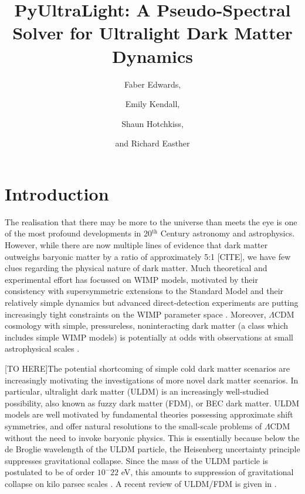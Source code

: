 \documentclass[a4paper,11pt]{article}
\title{ PyUltraLight: A Pseudo-Spectral Solver for Ultralight Dark Matter Dynamics}
\author[]{Faber Edwards,}
\author[]{Emily Kendall,}
\author[]{Shaun Hotchkiss,}
\author[]{and Richard Easther}
\affiliation[]{Department of Physics, University of Auckland, Private Bag 92019, Auckland, New Zealand}
\begin{document}
\maketitle
\flushbottom

\section{Introduction}
\label{sec:intro}

The realisation that there may be more to the universe than meets the eye is one of the most profound developments in 20$^{\textrm{th}}$ Century astronomy and astrophysics. However,  while there are now multiple lines of evidence that dark matter outweighs baryonic matter by a ratio of approximately 5:1 [CITE], we have few clues regarding the physical nature of dark matter.  Much theoretical and experimental effort has focussed on  WIMP models, motivated by their consistency with supersymmetric extensions to the Standard Model and their relatively simple dynamics but advanced direct-detection experiments are putting increasingly tight constraints on the WIMP parameter space \cite{Tan2016, Akerib2017}. Moreover, $\Lambda$CDM cosmology with simple, pressureless, noninteracting dark matter (a class which includes simple WIMP models) is potentially at odds with observations at small astrophysical scales \cite{Bull2016}.  

[TO HERE]The potential shortcoming of simple cold dark matter scenarios are increasingly motivating the investigations of more novel dark matter scenarios. In particular, ultralight dark matter (ULDM) is an increasingly well-studied possibility, also known as fuzzy dark matter (FDM), or BEC dark matter. ULDM models are well motivated by fundamental theories possessing approximate shift symmetries, and offer natural resolutions to the small-scale problems of $\Lambda$CDM without the need to invoke baryonic physics. This is essentially because below the de Broglie wavelength of the ULDM particle, the Heisenberg uncertainty principle suppresses gravitational collapse. Since the mass of the ULDM particle is postulated to be of order $10^-22$ eV, this amounts to suppression of gravitational collapse on kilo parsec scales \cite{Hu2000}. A recent review of ULDM/FDM is given in \cite{Hui2016}.
\end{document}
